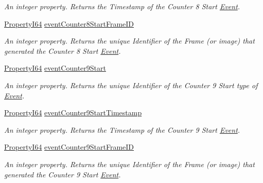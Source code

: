 \begin{DoxyCompactItemize}
\begin{DoxyCompactList}\small\item\em An integer property. Returns the Timestamp of the Counter 8 Start \hyperlink{classmv_i_m_p_a_c_t_1_1acquire_1_1_event}{Event}. \end{DoxyCompactList}\item 
\hyperlink{group___common_interface_ga81749b2696755513663492664a18a893}{Property\+I64} \hyperlink{classmv_i_m_p_a_c_t_1_1acquire_1_1_gen_i_cam_1_1_event_control_a0e53e32cbfe7d6359278d194bef61dd7}{event\+Counter8\+Start\+Frame\+I\+D}
\begin{DoxyCompactList}\small\item\em An integer property. Returns the unique Identifier of the Frame (or image) that generated the Counter 8 Start \hyperlink{classmv_i_m_p_a_c_t_1_1acquire_1_1_event}{Event}. \end{DoxyCompactList}\item 
\hyperlink{group___common_interface_ga81749b2696755513663492664a18a893}{Property\+I64} \hyperlink{classmv_i_m_p_a_c_t_1_1acquire_1_1_gen_i_cam_1_1_event_control_aaa468978d582aea7ca74aab67ffbafba}{event\+Counter9\+Start}
\begin{DoxyCompactList}\small\item\em An integer property. Returns the unique Identifier of the Counter 9 Start type of \hyperlink{classmv_i_m_p_a_c_t_1_1acquire_1_1_event}{Event}. \end{DoxyCompactList}\item 
\hyperlink{group___common_interface_ga81749b2696755513663492664a18a893}{Property\+I64} \hyperlink{classmv_i_m_p_a_c_t_1_1acquire_1_1_gen_i_cam_1_1_event_control_aaf120576e5306df41e419ddca6a18fa0}{event\+Counter9\+Start\+Timestamp}
\begin{DoxyCompactList}\small\item\em An integer property. Returns the Timestamp of the Counter 9 Start \hyperlink{classmv_i_m_p_a_c_t_1_1acquire_1_1_event}{Event}. \end{DoxyCompactList}\item 
\hyperlink{group___common_interface_ga81749b2696755513663492664a18a893}{Property\+I64} \hyperlink{classmv_i_m_p_a_c_t_1_1acquire_1_1_gen_i_cam_1_1_event_control_a4f3f815555279f487d4b4e398d985a45}{event\+Counter9\+Start\+Frame\+I\+D}
\begin{DoxyCompactList}\small\item\em An integer property. Returns the unique Identifier of the Frame (or image) that generated the Counter 9 Start \hyperlink{classmv_i_m_p_a_c_t_1_1acquire_1_1_event}{Event}. \end{DoxyCompactList}\item 

\end{DoxyCompactItemize}
